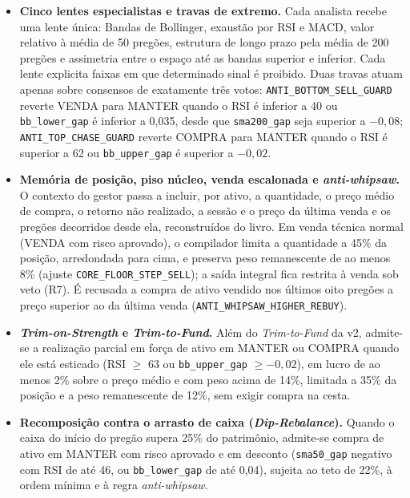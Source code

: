\begin{itemize}
  \item \textbf{Cinco lentes especialistas e travas de extremo.} Cada analista recebe uma lente única: Bandas de Bollinger, exaustão por RSI e MACD, valor relativo à média de 50 pregões, estrutura de longo prazo pela média de 200 pregões e assimetria entre o espaço até as bandas superior e inferior. Cada lente explicita faixas em que determinado sinal é proibido. Duas travas atuam apenas sobre consensos de exatamente três votos: \texttt{ANTI\_BOTTOM\_SELL\_GUARD} reverte VENDA para MANTER quando o RSI é inferior a 40 ou \texttt{bb\_lower\_gap} é inferior a 0,035, desde que \texttt{sma200\_gap} seja superior a $-0{,}08$; \texttt{ANTI\_TOP\_CHASE\_GUARD} reverte COMPRA para MANTER quando o RSI é superior a 62 ou \texttt{bb\_upper\_gap} é superior a $-0{,}02$.
  \item \textbf{Memória de posição, piso núcleo, venda escalonada e \textit{anti-whipsaw}.} O contexto do gestor passa a incluir, por ativo, a quantidade, o preço médio de compra, o retorno não realizado, a sessão e o preço da última venda e os pregões decorridos desde ela, reconstruídos do livro. Em venda técnica normal (VENDA com risco aprovado), o compilador limita a quantidade a 45\% da posição, arredondada para cima, e preserva peso remanescente de ao menos 8\% (ajuste \texttt{CORE\_FLOOR\_STEP\_SELL}); a saída integral fica restrita à venda sob veto (R7). É recusada a compra de ativo vendido nos últimos oito pregões a preço superior ao da última venda (\texttt{ANTI\_WHIPSAW\_HIGHER\_REBUY}).
  \item \textbf{\textit{Trim-on-Strength} e \textit{Trim-to-Fund}.} Além do \textit{Trim-to-Fund} da v2, admite-se a realização parcial em força de ativo em MANTER ou COMPRA quando ele está esticado (RSI $\geq$ 63 ou \texttt{bb\_upper\_gap} $\geq -0{,}02$), em lucro de ao menos 2\% sobre o preço médio e com peso acima de 14\%, limitada a 35\% da posição e a peso remanescente de 12\%, sem exigir compra na cesta.
  \item \textbf{Recomposição contra o arrasto de caixa (\textit{Dip-Rebalance}).} Quando o caixa do início do pregão supera 25\% do patrimônio, admite-se compra de ativo em MANTER com risco aprovado e em desconto (\texttt{sma50\_gap} negativo com RSI de até 46, ou \texttt{bb\_lower\_gap} de até 0,04), sujeita ao teto de 22\%, à ordem mínima e à regra \textit{anti-whipsaw}.
\end{itemize}



